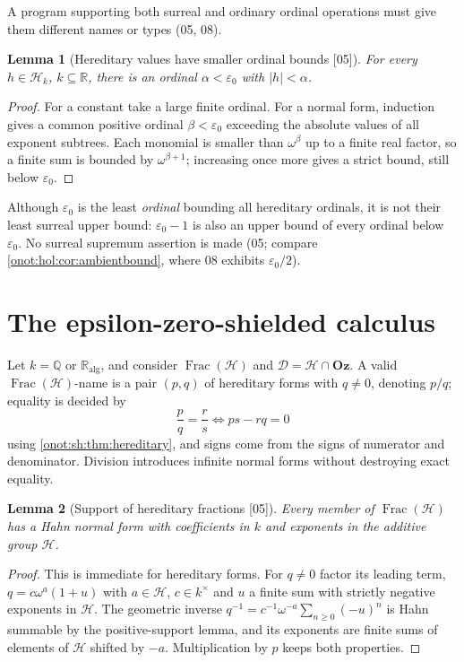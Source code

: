 \documentclass[11pt,oneside]{article}
\numberwithin{equation}{section}
\newtheorem{lemma}[lemma]{Lemma}
\theoremstyle{definition}
\theoremstyle{remark}
\newcommand{\Oz}{\mathbf{Oz}}
\newcommand{\Q}{\mathbb Q}
\newcommand{\R}{\mathbb R}
\newcommand{\Ralg}{\R_{\mathrm{alg}}}
\newcommand{\Hh}{\mathcal H}
\newcommand{\Dd}{\mathcal D}
\newcommand{\FH}{\operatorname{Frac}(\mathcal H)}
\newcommand{\src}[1]{\textup{\textsf{\small[#1]}}}
\begin{document}
A program supporting both surreal and ordinary ordinal operations must give them
different names or types (05, 08).

\begin{lemma}[Hereditary values have smaller ordinal bounds \src{05}]\label{onot:sh:lem:epsilonbound}
For every $h\in\Hh_k$, $k\subseteq\R$, there is an ordinal $\alpha<\varepsilon_0$
with $|h|<\alpha$.
\end{lemma}
\begin{proof}
For a constant take a large finite ordinal. For a normal form, induction gives a
common positive ordinal $\beta<\varepsilon_0$ exceeding the absolute values of all
exponent subtrees. Each monomial is smaller than $\omega^\beta$ up to a finite
real factor, so a finite sum is bounded by $\omega^{\beta+1}$; increasing once
more gives a strict bound, still below $\varepsilon_0$.
\end{proof}

Although $\varepsilon_0$ is the least \emph{ordinal} bounding all hereditary
ordinals, it is not their least surreal upper bound: $\varepsilon_0-1$ is also an
upper bound of every ordinal below $\varepsilon_0$. No surreal supremum assertion
is made (05; compare \cref{onot:hol:cor:ambientbound}, where 08 exhibits
$\varepsilon_0/2$).

\section{The epsilon-zero-shielded calculus}\label{onot:sh:sec:epsilon}

Let $k=\Q$ or $\Ralg$, and consider $\FH$ and $\Dd=\Hh\cap\Oz$. A valid
$\FH$-name is a pair $(p,q)$ of hereditary forms with $q\ne0$, denoting $p/q$;
equality is decided by
\begin{equation}\label{onot:sh:eq:crossmultiply}
 \frac pq=\frac rs\iff ps-rq=0
\end{equation}
using \cref{onot:sh:thm:hereditary}, and signs come from the signs of numerator
and denominator. Division introduces infinite normal forms without destroying
exact equality.

\begin{lemma}[Support of hereditary fractions \src{05}]\label{onot:sh:lem:fractionsupport}
Every member of $\FH$ has a Hahn normal form with coefficients in $k$ and
exponents in the additive group $\Hh$.
\end{lemma}
\begin{proof}
This is immediate for hereditary forms. For $q\ne0$ factor its leading term,
$q=c\omega^a(1+u)$ with $a\in\Hh$, $c\in k^\times$ and $u$ a finite sum with
strictly negative exponents in $\Hh$. The geometric inverse
$q^{-1}=c^{-1}\omega^{-a}\sum_{n\ge0}(-u)^n$ is Hahn summable by the
positive-support lemma, and its exponents are finite sums of elements of $\Hh$
shifted by $-a$. Multiplication by $p$ keeps both properties.
\end{proof}
\end{document}
